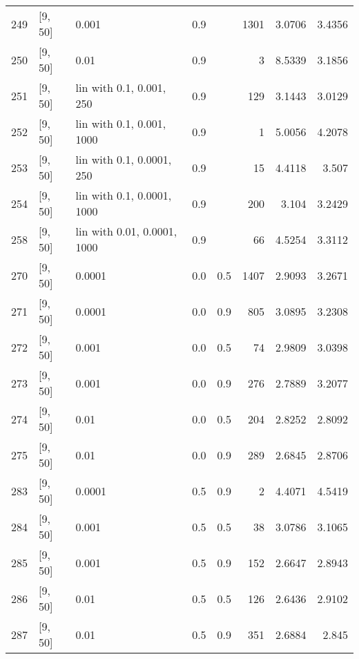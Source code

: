 \begin{longtable}{lllrrrrr}
  249 &            [9, 50] &                       0.001 &      0.9 &     & 1301 &   3.0706 &   3.4356 \\
  250 &            [9, 50] &                        0.01 &      0.9 &     &    3 &   8.5339 &   3.1856 \\
  251 &            [9, 50] &    lin with 0.1, 0.001, 250 &      0.9 &     &  129 &   3.1443 &   3.0129 \\
  252 &            [9, 50] &   lin with 0.1, 0.001, 1000 &      0.9 &     &    1 &   5.0056 &   4.2078 \\
  253 &            [9, 50] &   lin with 0.1, 0.0001, 250 &      0.9 &     &   15 &   4.4118 &    3.507 \\
  254 &            [9, 50] &  lin with 0.1, 0.0001, 1000 &      0.9 &     &  200 &    3.104 &   3.2429 \\
  258 &            [9, 50] & lin with 0.01, 0.0001, 1000 &      0.9 &     &   66 &   4.5254 &   3.3112 \\
  270 &            [9, 50] &                      0.0001 &      0.0 & 0.5 & 1407 &   2.9093 &   3.2671 \\
  271 &            [9, 50] &                      0.0001 &      0.0 & 0.9 &  805 &   3.0895 &   3.2308 \\
  272 &            [9, 50] &                       0.001 &      0.0 & 0.5 &   74 &   2.9809 &   3.0398 \\
  273 &            [9, 50] &                       0.001 &      0.0 & 0.9 &  276 &   2.7889 &   3.2077 \\
  274 &            [9, 50] &                        0.01 &      0.0 & 0.5 &  204 &   2.8252 &   2.8092 \\
  275 &            [9, 50] &                        0.01 &      0.0 & 0.9 &  289 &   2.6845 &   2.8706 \\
  283 &            [9, 50] &                      0.0001 &      0.5 & 0.9 &    2 &   4.4071 &   4.5419 \\
  284 &            [9, 50] &                       0.001 &      0.5 & 0.5 &   38 &   3.0786 &   3.1065 \\
  285 &            [9, 50] &                       0.001 &      0.5 & 0.9 &  152 &   2.6647 &   2.8943 \\
  286 &            [9, 50] &                        0.01 &      0.5 & 0.5 &  126 &   2.6436 &   2.9102 \\
  287 &            [9, 50] &                        0.01 &      0.5 & 0.9 &  351 &   2.6884 &    2.845 \\

\end{longtable}

